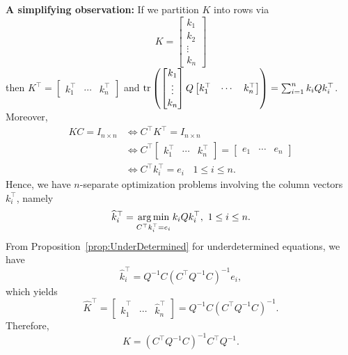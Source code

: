     \textbf{A simplifying observation:} If we partition $K$ into rows via 
    $$K= \begin{bmatrix}
        k_1\\
        k_2\\
        \vdots\\
        k_n
    \end{bmatrix}$$
then $K^\top =\begin{bmatrix}
        k_1^\top &   \dotsb &  k_n^\top
    \end{bmatrix}$
    and $ \operatorname*{\rm tr}\left(\begin{bmatrix}
            {k_1}\\
            \vdots\\
            {k_n}
            \end{bmatrix}Q\begin{bmatrix}k_1^\top & \dotsb& k_n^\top\end{bmatrix}\right) =\sum^{n}_{i=1}k_iQk_i^\top$. Moreover, 
    \begin{align*}
        KC= I_{n\times n} &\iff C^\top K^\top =I_{n\times n}\\
        &\iff C^\top \begin{bmatrix}k_1^\top &  \dotsb & k_n^\top\end{bmatrix}=\begin{bmatrix}e_1 & \dotsb & e_n\end{bmatrix}\\
        &\iff C^\top k_i^\top=e_i\ \ \ \ 1\leq i\leq n.
    \end{align*}
Hence, we have $n$-separate optimization problems involving the column vectors $k_i^\top $, namely
    \begin{equation*}
        \widehat{k}_i^\top = \operatorname*{arg\,min}_{C^\top k_i^\top=e_i} k_i Q k_i^\top, ~1 \le i \le n.
    \end{equation*}
    From Proposition~\ref{prop:UnderDetermined} for underdetermined equations, we have
$$\widehat{k}_i^\top = Q^{-1}C(C^\top Q^{-1}C)^{-1}e_i,$$
which yields
$$ \widehat{K}^\top = \begin{bmatrix} \widehat{k}_1^\top & \cdots & \widehat{k}_n^\top \end{bmatrix}=Q^{-1}C(C^\top Q^{-1}C)^{-1}.$$
    \newline
    Therefore,
    \begin{equation*}
      \widehat{K}= (C^\top Q^{-1}C)^{-1}C^\top Q^{-1}.
      \end{equation*}
\vspace*{.2cm}

